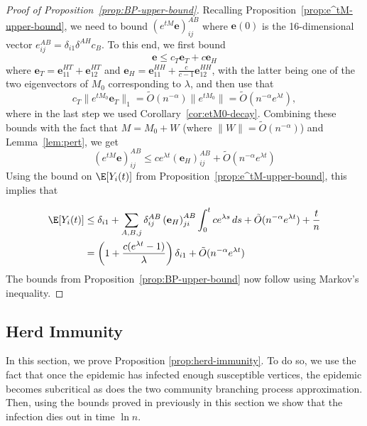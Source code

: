 \documentclass[11pt]{article}
\begin{document}
\begin{proof}[Proof of Proposition~\ref{prop:BP-upper-bound}]
Recalling Proposition~\ref{prop:e^tM-upper-bound}, we need to bound 
$
\left(e^{tM}\mathbf e\right)_{ij}^{AB}$
where $\mathbf e(0)$ is the 16-dimensional vector $e_{ij}^{AB}=\delta_{i1}\delta^{AH}c_B$.
To this end, we first bound
\[
\mathbf e \leq c_T {\mathbf e}_T + c \mathbf e_H
\]
where ${\mathbf e_T}=\mathbf e_{11}^{HT}+\mathbf e_{12}^{HT}$ and $\mathbf e_H={\mathbf e}_{11}^{HH}+\frac c{c-1}{\mathbf e}_{12}^{HH}$, with the latter being one of the two eigenvectors of $M_0$ corresponding to $\lambda$, and then use that
$$c_T\|e^{tM_0}\mathbf e_T\|_1=\tilde O(n^{-\alpha})\|e^{tM_0}\|=\tilde O(n^{-\alpha}e^{\lambda t}),
$$
where in the last step we used Corollary~\ref{cor:etM0-decay}.
Combining these bounds with the fact that $M=M_0+W$ (where $\|W\|=\tilde O(n^{-\alpha})$) and  
Lemma~\ref{lem:pert},
we get
$$
\left(e^{tM}\mathbf e\right)_{ij}^{AB}
\leq c e^{\lambda t}\left(\mathbf e_H\right)_{ij}^{AB}
+\tilde O(n^{-\alpha}e^{\lambda t})
$$
Using the bound on $\E[Y_i(t)]$ from Proposition~\ref{prop:e^tM-upper-bound}, this implies that

\begin{align*}
\E[Y_i(t)]&\leq \delta_{i1}+
\sum_{A,B,j}\delta_{ij}^{AB}\left(\mathbf e_H\right)_{ji}^{AB}\int_0^t ce^{\lambda s}\, ds+\tilde O(n^{-\alpha}e^{\lambda t})+\frac tn
\\
&=
\left(1+\frac{c(e^{\lambda t}-1)}\lambda\right)\delta_{i1}+\tilde O(n^{-\alpha}e^{\lambda t})
\end{align*}
The bounds from Proposition~\ref{prop:BP-upper-bound} now follow using 
Markov's inequality.
\end{proof}



\subsection{Herd Immunity}\label{sec:Herd-Immunity}
In this section, we prove Proposition \ref{prop:herd-immunity}. To do so, we use the fact that once the epidemic has infected enough susceptible vertices, the epidemic becomes subcritical as does the two community branching process approximation. Then, using the bounds proved in previously in this section we show that the infection dies out in time  $\ln n$.
\end{document}
